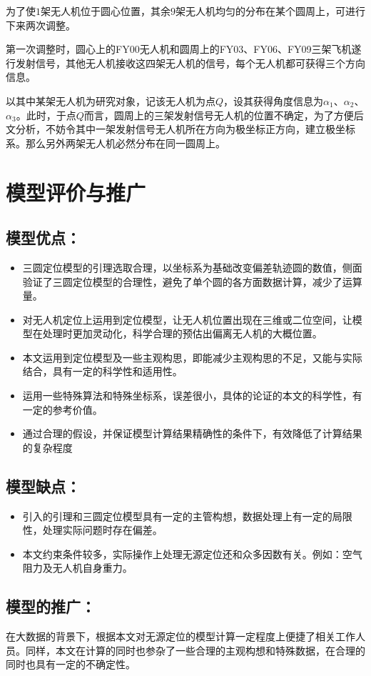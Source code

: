 为了使$1$架无人机位于圆心位置，其余$9$架无人机均匀的分布在某个圆周上，可进行下来两次调整。

第一次调整时，圆心上的FY00无人机和圆周上的FY03、FY06、FY09三架飞机遂行发射信号，其他无人机接收这四架无人机的信号，每个无人机都可获得三个方向信息。

以其中某架无人机为研究对象，记该无人机为点$Q$，设其获得角度信息为$\alpha_1$、$\alpha_2$、$\alpha_3$。此时，于点$Q$而言，圆周上的三架发射信号无人机的位置不确定，为了方便后文分析，不妨令其中一架发射信号无人机所在方向为极坐标正方向，建立极坐标系。那么另外两架无人机必然分布在同一圆周上。





\section{模型评价与推广}

\subsection{模型优点：}

\begin{itemize}
    \item 三圆定位模型的引理选取合理，以坐标系为基础改变偏差轨迹圆的数值，侧面验证了三圆定位模型的合理性，避免了单个圆的各方面数据计算，减少了运算量。\cite{TongJiDaXueShuXueXiGaoDengShuXue}
    \item 对无人机定位上运用到定位模型，让无人机位置出现在三维或二位空间，让模型在处理时更加灵动化，科学合理的预估出偏离无人机的大概位置。
    \item 本文运用到定位模型及一些主观构思，即能减少主观构思的不足，又能与实际结合，具有一定的科学性和适用性。
    \item 运用一些特殊算法和特殊坐标系，误差很小，具体的论证的本文的科学性，有一定的参考价值。
    \item 通过合理的假设，并保证模型计算结果精确性的条件下，有效降低了计算结果的复杂程度
\end{itemize}

\subsection{模型缺点：}

\begin{itemize}
    \item 引入的引理和三圆定位模型具有一定的主管构想，数据处理上有一定的局限性，处理实际问题时存在偏差。
    \item 本文约束条件较多，实际操作上处理无源定位还和众多因数有关。例如：空气阻力及无人机自身重力。
\end{itemize}

\subsection{模型的推广：}

在大数据的背景下，根据本文对无源定位的模型计算一定程度上便捷了相关工作人员。同样，本文在计算的同时也参杂了一些合理的主观构想和特殊数据，在合理的同时也具有一定的不确定性。
